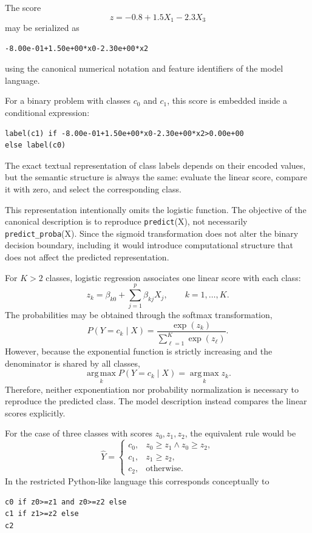 \begin{example}
The score
\[
z = -0.8 + 1.5X_1 - 2.3X_3
\]
may be serialized as
\begin{verbatim}
-8.00e-01+1.50e+00*x0-2.30e+00*x2
\end{verbatim}
using the canonical numerical notation and feature identifiers of the model language.

For a binary problem with classes $c_0$ and $c_1$, this score is embedded inside a conditional expression:
\begin{verbatim}
label(c1) if -8.00e-01+1.50e+00*x0-2.30e+00*x2>0.00e+00
else label(c0)
\end{verbatim}
\end{example}

The exact textual representation of class labels depends on their encoded values, but the semantic structure is always the same: evaluate the linear score, compare it with zero, and select the corresponding class.

This representation intentionally omits the logistic function. The objective of the canonical description is to reproduce \texttt{predict}(X), not necessarily \texttt{predict\_proba}(X). Since the sigmoid transformation does not alter the binary decision boundary, including it would introduce computational structure that does not affect the predicted representation.

For $K>2$ classes, logistic regression associates one linear score with each class:
\[
z_k = \beta_{k0} + \sum_{j=1}^{p}\beta_{kj}X_j, \qquad k=1,\ldots,K.
\]
The probabilities may be obtained through the softmax transformation,
\[
P(Y=c_k\mid X) = \frac{\exp(z_k)} {\sum_{\ell=1}^{K}\exp(z_\ell)}.
\]
However, because the exponential function is strictly increasing and the denominator is shared by all classes,
\[
\operatorname*{arg\,max}_k P(Y=c_k\mid X) = \operatorname*{arg\,max}_k z_k.
\]
Therefore, neither exponentiation nor probability normalization is necessary to reproduce the predicted class. The model description instead compares the linear scores explicitly.

\begin{example}
For the case of three classes with scores $z_0,z_1,z_2$, the equivalent rule would be
\[
\widehat{Y} =
\begin{cases}
c_0, & z_0\geq z_1 \land z_0\geq z_2, \\
c_1, & z_1\geq z_2, \\
c_2, & \text{otherwise}.
\end{cases}
\]
In the restricted Python-like language this corresponds conceptually to
\begin{verbatim}
c0 if z0>=z1 and z0>=z2 else
c1 if z1>=z2 else
c2
\end{verbatim}
\end{example}


